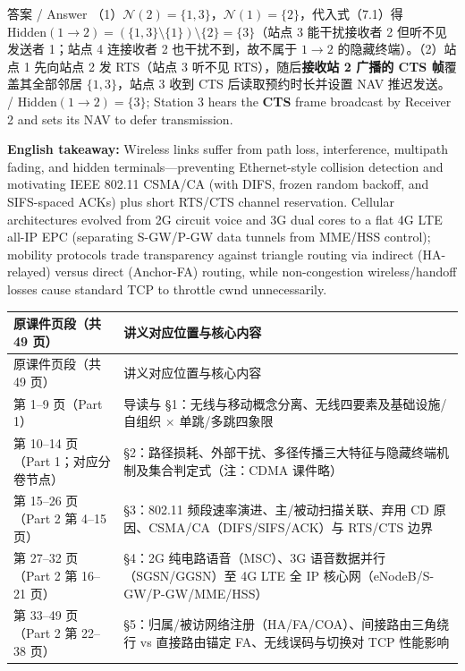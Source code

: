 \begin{StudySolution}{答案 / Answer}
（1）$\mathcal{N}(2) = \{1, 3\}$，$\mathcal{N}(1) = \{2\}$，代入式（7.1）得 $\mathrm{Hidden}(1\to 2) = (\{1,3\}\setminus\{1\})\setminus\{2\} = \{3\}$（站点 3 能干扰接收者 2 但听不见发送者 1；站点 4 连接收者 2 也干扰不到，故不属于 $1\to 2$ 的隐藏终端）。（2）站点 1 先向站点 2 发 RTS（站点 3 听不见 RTS），随后\textbf{接收站 2 广播的 CTS 帧}覆盖其全部邻居 $\{1, 3\}$，站点 3 收到 CTS 后读取预约时长并设置 NAV 推迟发送。 / $\mathrm{Hidden}(1\to 2)=\{3\}$; Station 3 hears the \textbf{CTS} frame broadcast by Receiver 2 and sets its NAV to defer transmission.
\end{StudySolution}

\textbf{English takeaway:} Wireless links suffer from path loss, interference, multipath fading, and hidden terminals—preventing Ethernet-style collision detection and motivating IEEE 802.11 CSMA/CA (with DIFS, frozen random backoff, and SIFS-spaced ACKs) plus short RTS/CTS channel reservation. Cellular architectures evolved from 2G circuit voice and 3G dual cores to a flat 4G LTE all-IP EPC (separating S-GW/P-GW data tunnels from MME/HSS control); mobility protocols trade transparency against triangle routing via indirect (HA-relayed) versus direct (Anchor-FA) routing, while non-congestion wireless/handoff losses cause standard TCP to throttle $\mathrm{cwnd}$ unnecessarily.



\begingroup\small\setlength{\tabcolsep}{3pt}\renewcommand{\arraystretch}{1.22}
\begin{longtable}{@{}>{\raggedright\arraybackslash}p{}>{\raggedright\arraybackslash}p{}@{}}
\toprule
原课件页段（共 49 页） & 讲义对应位置与核心内容 \\
\midrule\endfirsthead
原课件页段（共 49 页） & 讲义对应位置与核心内容 \\
\midrule\endhead
\bottomrule\endfoot
第 1–9 页（Part 1） & 导读与 §1：无线与移动概念分离、无线四要素及基础设施/自组织 $\times$ 单跳/多跳四象限 \\
第 10–14 页（Part 1；对应分卷节点） & §2：路径损耗、外部干扰、多径传播三大特征与隐藏终端机制及集合判定式（注：CDMA 课件略） \\
第 15–26 页（Part 2 第 4–15 页） & §3：802.11 频段速率演进、主/被动扫描关联、弃用 CD 原因、CSMA/CA（DIFS/SIFS/ACK）与 RTS/CTS 边界 \\
第 27–32 页（Part 2 第 16–21 页） & §4：2G 纯电路语音（MSC）、3G 语音数据并行（SGSN/GGSN）至 4G LTE 全 IP 核心网（eNodeB/S-GW/P-GW/MME/HSS） \\
第 33–49 页（Part 2 第 22–38 页） & §5：归属/被访网络注册（HA/FA/COA）、间接路由三角绕行 vs 直接路由锚定 FA、无线误码与切换对 TCP 性能影响 \\
\end{longtable}\endgroup
